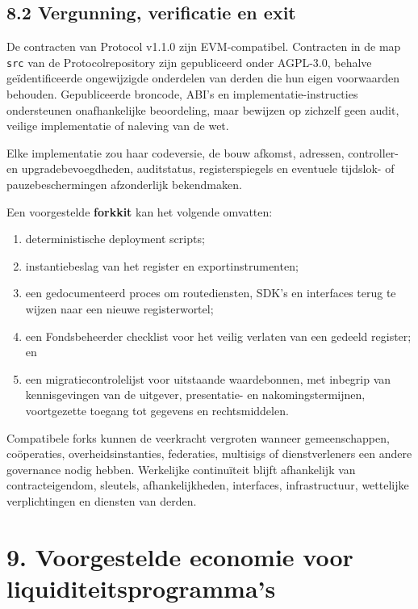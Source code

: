 \documentclass[11pt]{article}
\begin{document}
\subsection*{8.2 Vergunning, verificatie en exit}

De contracten van Protocol v1.1.0 zijn EVM-compatibel. Contracten in de map \texttt{src} van de Protocolrepository zijn gepubliceerd onder AGPL-3.0, behalve geïdentificeerde ongewijzigde onderdelen van derden die hun eigen voorwaarden behouden. Gepubliceerde broncode, ABI's en implementatie-instructies ondersteunen onafhankelijke beoordeling, maar bewijzen op zichzelf geen audit, veilige implementatie of naleving van de wet.

Elke implementatie zou haar codeversie, de bouw afkomst, adressen, controller- en upgradebevoegdheden, auditstatus, registerspiegels en eventuele tijdslok- of pauzebeschermingen afzonderlijk bekendmaken.

Een voorgestelde \textbf{forkkit} kan het volgende omvatten:

\begin{enumerate}[leftmargin=*]
\item deterministische deployment scripts;
\item instantiebeslag van het register en exportinstrumenten;
\item een gedocumenteerd proces om routediensten, SDK's en interfaces terug te wijzen naar een nieuwe registerwortel;
\item een Fondsbeheerder checklist voor het veilig verlaten van een gedeeld register; en
\item een migratiecontrolelijst voor uitstaande waardebonnen, met inbegrip van kennisgevingen van de uitgever, presentatie- en nakomingstermijnen, voortgezette toegang tot gegevens en rechtsmiddelen.
\end{enumerate}
Compatibele forks kunnen de veerkracht vergroten wanneer gemeenschappen, coöperaties, overheidsinstanties, federaties, multisigs of dienstverleners een andere governance nodig hebben. Werkelijke continuïteit blijft afhankelijk van contracteigendom, sleutels, afhankelijkheden, interfaces, infrastructuur, wettelijke verplichtingen en diensten van derden.


\section*{9. Voorgestelde economie voor liquiditeitsprogramma's}
\end{document}
